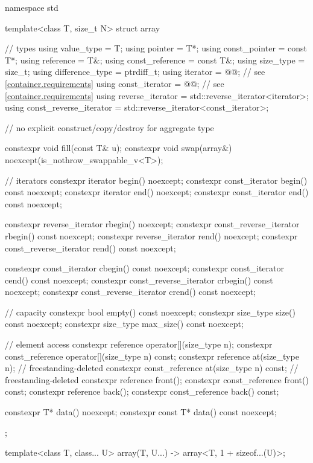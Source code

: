 %
%
%
%
%
\begin{codeblock}
namespace std {
  template<class T, size_t N>
  struct array {
    // types
    using value_type             = T;
    using pointer                = T*;
    using const_pointer          = const T*;
    using reference              = T&;
    using const_reference        = const T&;
    using size_type              = size_t;
    using difference_type        = ptrdiff_t;
    using iterator               = @@; // see \ref{container.requirements}
    using const_iterator         = @@; // see \ref{container.requirements}
    using reverse_iterator       = std::reverse_iterator<iterator>;
    using const_reverse_iterator = std::reverse_iterator<const_iterator>;

    // no explicit construct/copy/destroy for aggregate type

    constexpr void fill(const T& u);
    constexpr void swap(array&) noexcept(is_nothrow_swappable_v<T>);

    // iterators
    constexpr iterator               begin() noexcept;
    constexpr const_iterator         begin() const noexcept;
    constexpr iterator               end() noexcept;
    constexpr const_iterator         end() const noexcept;

    constexpr reverse_iterator       rbegin() noexcept;
    constexpr const_reverse_iterator rbegin() const noexcept;
    constexpr reverse_iterator       rend() noexcept;
    constexpr const_reverse_iterator rend() const noexcept;

    constexpr const_iterator         cbegin() const noexcept;
    constexpr const_iterator         cend() const noexcept;
    constexpr const_reverse_iterator crbegin() const noexcept;
    constexpr const_reverse_iterator crend() const noexcept;

    // capacity
    constexpr bool empty() const noexcept;
    constexpr size_type size() const noexcept;
    constexpr size_type max_size() const noexcept;

    // element access
    constexpr reference       operator[](size_type n);
    constexpr const_reference operator[](size_type n) const;
    constexpr reference       at(size_type n);                          // freestanding-deleted
    constexpr const_reference at(size_type n) const;                    // freestanding-deleted
    constexpr reference       front();
    constexpr const_reference front() const;
    constexpr reference       back();
    constexpr const_reference back() const;

    constexpr T*       data() noexcept;
    constexpr const T* data() const noexcept;
  };

  template<class T, class... U>
    array(T, U...) -> array<T, 1 + sizeof...(U)>;
}
\end{codeblock}

